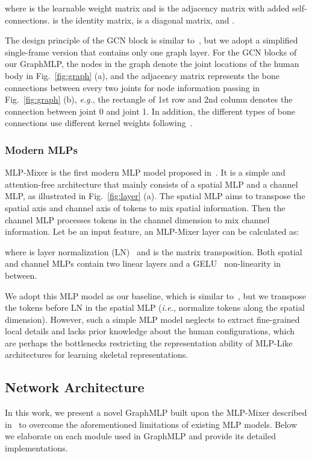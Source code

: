 \documentclass[lettersize,journal]{IEEEtran}
\begin{document}
where  is the learnable weight matrix and  is the adjacency matrix with added self-connections. 
 is the identity matrix,  is a diagonal matrix, and . 

The design principle of the GCN block is similar to~\cite{stgcn}, but we adopt a simplified single-frame version that contains only one graph layer. 
For the GCN blocks of our GraphMLP, the nodes in the graph denote the joint locations of the human body in Fig.~\ref{fig:graph} (a), and the adjacency matrix represents the bone connections between every two joints for node information passing in Fig.~\ref{fig:graph} (b), \emph{e.g.}, the rectangle of 1st row and 2nd column denotes the connection between joint 0 and joint 1. 
In addition, the different types of bone connections use different kernel weights following~\cite{stgcn}. 

\subsubsection{Modern MLPs}
MLP-Mixer is the first modern MLP model proposed in~\cite{mlpmixer}. 
It is a simple and attention-free architecture that mainly consists of a spatial MLP and a channel MLP, as illustrated in Fig.~\ref{fig:layer} (a). 
The spatial MLP aims to transpose the spatial axis and channel axis of tokens to mix spatial information. Then the channel MLP processes tokens in the channel dimension to mix channel information. 
Let  be an input feature, an MLP-Mixer layer can be calculated as:

where  is layer normalization (LN)~\cite{ba2016layer} and  is the matrix transposition. 
Both spatial and channel MLPs contain two linear layers and a GELU~\cite{hendrycks2016gaussian} non-linearity in between. 

We adopt this MLP model as our baseline, which is similar to~\cite{mlpmixer}, but we transpose the tokens before LN in the spatial MLP (\emph{i.e.}, normalize tokens along the spatial dimension). 
However, such a simple MLP model neglects to extract fine-grained local details and lacks prior knowledge about the human configurations, which are perhaps the bottlenecks restricting the representation ability of MLP-Like architectures for learning skeletal representations. 

\subsection{Network Architecture}
In this work, we present a novel GraphMLP built upon the MLP-Mixer described in~\cite{mlpmixer} to overcome the aforementioned limitations of existing MLP models. 
Below we elaborate on each module used in GraphMLP and provide its detailed implementations. 
\end{document}
